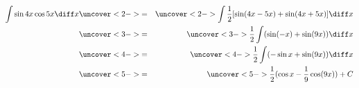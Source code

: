 \begin{frame}
\begin{example}[Example 9, p. 501]
\begin{eqnarray*}
\int \sin 4x \cos 5x \diff x & \uncover<2->{ = } & %
\uncover<2->{\int \frac{1}{2} [ \sin (4x - 5x) + \sin (4x + 5x)]\diff x}\\%
 & \uncover<3->{ = } & %
\uncover<3->{\frac{1}{2} \int  ( \sin (-x) + \sin (9x))\diff x}\\%
 & \uncover<4->{ = } & %
\uncover<4->{\frac{1}{2} \int  (-\sin x + \sin (9x))\diff x}\\%
 & \uncover<5->{ = } & %
\uncover<5->{\frac{1}{2}   (\cos x - \frac{1}{9}\cos (9x)) + C}\\%
\end{eqnarray*}
\end{example}
\end{frame}
